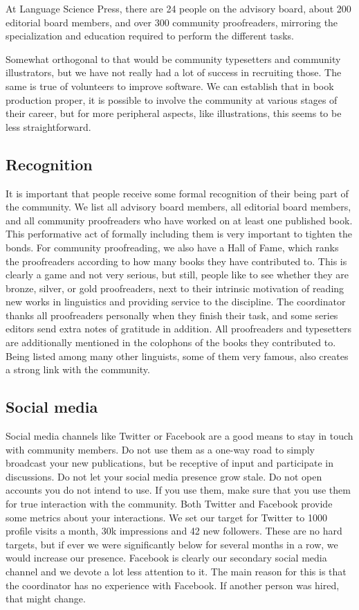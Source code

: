 \documentclass[guidelines,nonflat,modfonts] {langsci/langscibook}
\begin{document}
At Language Science Press, there are 24 people on the advisory board, about 200 editorial board members, and over 300 community proofreaders, mirroring the specialization and education required to perform the different tasks. 

Somewhat orthogonal to that would be community typesetters and community illustrators, but we have not really had a lot of success in recruiting those. The same is true of volunteers to improve software. We can establish that in book production proper, it is possible to involve the community at various stages of their career, but for more peripheral aspects, like illustrations, this seems to be less straightforward. 

\subsection{Recognition}
It is important that people receive some formal recognition of their being part of the community. We list all advisory board members, all editorial board members, and all community proofreaders who have worked on at least one published book. This performative act of formally including them is very important to tighten the bonds. For community proofreading, we also have a Hall of Fame, which ranks the proofreaders according to how many books they have contributed to. This is clearly a game and not very serious, but still, people like to see whether they are bronze, silver, or gold proofreaders, next to their intrinsic motivation of reading new works in linguistics and providing service to the discipline. The coordinator thanks all proofreaders personally when they finish their task, and some series editors send extra notes of gratitude in addition. All proofreaders and typesetters are additionally mentioned in the colophons of the books they contributed to. Being listed among many other linguists, some of them very famous, also creates a strong link with the community. 

\subsection{Social media}
Social media channels like Twitter or Facebook are a good means to stay in touch with community members. Do not use them as a one-way road to simply broadcast your new publications, but be receptive of input and participate in discussions. Do not let your social media presence grow stale. Do not open accounts you do not intend to use. If you use them, make sure that you use them for true interaction with the community. Both Twitter and Facebook provide some metrics about your interactions. We set our target for Twitter to 1000 profile visits a month, 30k impressions and 42 new followers. These are no hard targets, but if ever we were significantly below for several months in a row, we would increase our presence. 
Facebook is clearly our secondary social media channel and we devote a lot less attention to it. The main reason for this is that the coordinator has no experience with Facebook. If another person was hired, that might change. 
\end{document}

